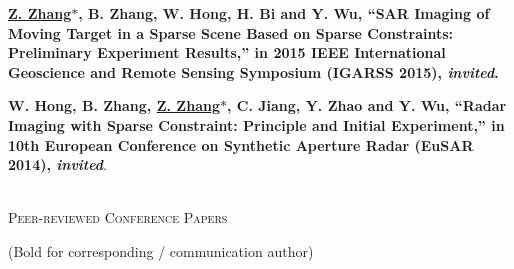 \documentclass[paper=a4,fontsize=11pt]{scrartcl}
\begin{document}
\begin{description}
   
\item \textbf{\underline{Z. Zhang$\ast$}, B. Zhang, W. Hong, H. Bi and Y. Wu, ``SAR Imaging of Moving Target in a Sparse Scene Based on Sparse Constraints: Preliminary Experiment Results,'' in 2015 IEEE International Geoscience and Remote Sensing Symposium (IGARSS 2015), \emph{invited}.}

\item \textbf{W. Hong, B. Zhang, \underline{Z. Zhang$\ast$}, C. Jiang, Y. Zhao and Y. Wu, ``Radar Imaging with Sparse Constraint: Principle and Initial Experiment,'' in 10th European Conference on Synthetic Aperture Radar (EuSAR 2014), \emph{invited}}.

\end{description}

~\\

\textsc{Peer-reviewed Conference Papers}

(Bold for corresponding / communication author)
\end{document}
